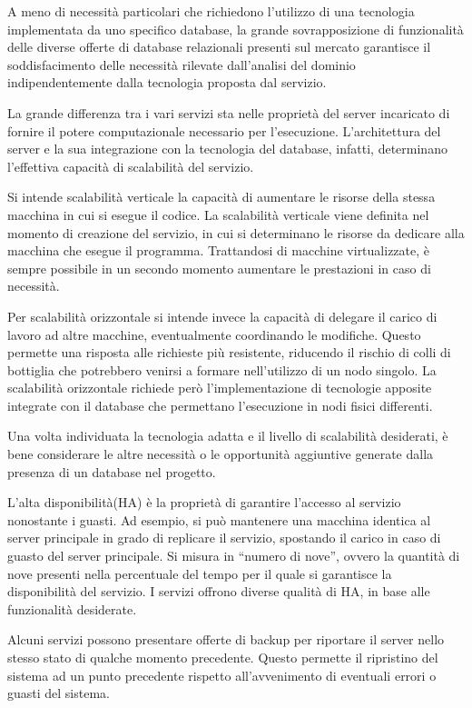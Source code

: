 A meno di necessità particolari che richiedono l’utilizzo di una tecnologia implementata da uno specifico database, la grande sovrapposizione di funzionalità delle diverse offerte di database relazionali presenti sul mercato garantisce il  soddisfacimento delle necessità rilevate dall’analisi del dominio indipendentemente dalla tecnologia proposta dal servizio.

La grande differenza tra i vari servizi sta nelle proprietà del server incaricato di fornire il potere computazionale necessario per l’esecuzione. L’architettura del server e la sua integrazione con la tecnologia del database, infatti, determinano l’effettiva capacità di scalabilità del servizio. 

Si intende scalabilità verticale la capacità di aumentare le risorse della stessa macchina in cui si esegue il codice. La scalabilità verticale viene definita nel momento di creazione del servizio, in cui si determinano le risorse da dedicare alla macchina che esegue il programma. Trattandosi di macchine virtualizzate, è sempre possibile in un secondo momento aumentare le prestazioni in caso di necessità.

Per scalabilità orizzontale si intende invece la capacità di delegare il carico di lavoro ad altre macchine, eventualmente coordinando le modifiche. Questo permette una risposta alle richieste più resistente, riducendo il rischio di colli di bottiglia che potrebbero venirsi a formare nell’utilizzo di un nodo singolo.
La scalabilità orizzontale richiede però l’implementazione di tecnologie apposite integrate con il database che permettano l’esecuzione in nodi fisici differenti. 

Una volta individuata la tecnologia adatta e il livello di scalabilità desiderati, è bene considerare le altre necessità o le opportunità aggiuntive generate dalla presenza di un database nel progetto. 

L’alta disponibilità(HA) è la proprietà di garantire l’accesso al servizio nonostante i guasti. Ad esempio, si può mantenere una macchina identica al server principale in grado di replicare il servizio, spostando il carico in caso di guasto del server principale. Si misura in “numero di nove”, ovvero la quantità di nove presenti nella percentuale del tempo per il quale si garantisce la disponibilità del servizio.
I servizi offrono diverse qualità di HA, in base alle funzionalità desiderate.

Alcuni servizi possono presentare offerte di backup per riportare il server nello stesso stato di qualche momento precedente. Questo permette il ripristino del sistema ad un punto precedente rispetto all’avvenimento di eventuali errori o guasti del sistema.

